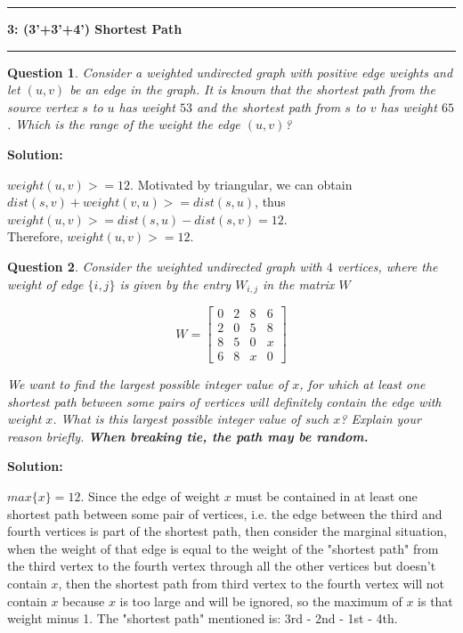 \documentclass[10.5pt]{article}
\newcommand\question[2]{\vspace{.25in}\hrule\textbf{#1: #2}\vspace{.5em}\hrule\vspace{.10in}}
\newtheorem{Q}{Question}
\begin{document}
\pagebreak
\question{3}{(3'+3'+4') Shortest Path}
\begin{Q}
	Consider a weighted undirected graph with positive edge weights and let $(u,v)$ be an edge in the graph. It is known that the shortest path from the source vertex $s$ to $u$ has weight $53$ and the shortest path from $s$ to $v$ has weight $65$. Which is the range of the weight the edge $(u,v)$?
\end{Q}
\par\textbf{Solution:}
\par\boldmath$weight(u,v) >= 12.$\unboldmath\: Motivated by triangular, we can obtain $dist(s,v) + weight(v,u) >= dist(s,u)$, thus $weight(u,v) >= dist(s,u) - dist(s,v) = 12$.\\
Therefore, $weight(u,v) >= 12$.
\vspace{120pt}
\begin{Q}
	Consider the weighted undirected graph with $4$ vertices, where the weight of edge $\{i,j\}$ is given by the entry $W_{i,j}$ in the matrix $W$
	
	$$W=\begin{bmatrix} 0 & 2 & 8 & 6\\ 2 & 0 & 5 & 8\\ 8 & 5 & 0 & x\\ 6 & 8 & x & 0 \end{bmatrix}$$
	
	We want to find the largest possible integer value of $x$, for which at least one shortest path between some pairs of vertices will definitely contain the edge with weight $x$. What is this largest possible integer value of such $x$? Explain your reason briefly. \textbf{When breaking tie, the path may be random.}
\end{Q}
\par\textbf{Solution:}
\par \boldmath$max\{x\} = 12.$\unboldmath\: Since the edge of weight $x$ must be contained in at least one shortest path between some pair of vertices, i.e. the edge between the third and fourth vertices is part of the shortest path, then consider the marginal situation, when the weight of that edge is equal to the weight of the "shortest path" from the third vertex to the fourth vertex through all the other vertices but doesn't contain $x$, then the shortest path from third vertex to the fourth vertex will not contain $x$ because $x$ is too large and will be ignored, so the maximum of $x$ is that weight minus 1. The "shortest path" mentioned is: 3rd - 2nd - 1st - 4th.\\
\end{document}
